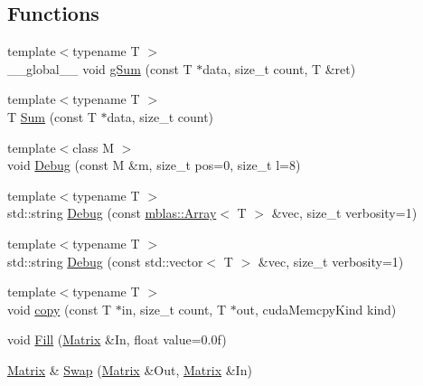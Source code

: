 \subsection*{Functions}
\begin{DoxyCompactItemize}
\item 
{\footnotesize template$<$typename T $>$ }\\\+\_\+\+\_\+global\+\_\+\+\_\+ void \hyperlink{namespaceamunmt_1_1GPU_1_1mblas_a6d3fc25d9092bb620ee6cf18bf08466a}{g\+Sum} (const T $\ast$data, size\+\_\+t count, T \&ret)
\item 
{\footnotesize template$<$typename T $>$ }\\T \hyperlink{namespaceamunmt_1_1GPU_1_1mblas_a9ef50bea247d2ef942fbb6d73e3ccaa7}{Sum} (const T $\ast$data, size\+\_\+t count)
\item 
{\footnotesize template$<$class M $>$ }\\void \hyperlink{namespaceamunmt_1_1GPU_1_1mblas_acd328e19f90abba621b306ccfa9ac0a5}{Debug} (const M \&m, size\+\_\+t pos=0, size\+\_\+t l=8)
\item 
{\footnotesize template$<$typename T $>$ }\\std\+::string \hyperlink{namespaceamunmt_1_1GPU_1_1mblas_aabb52352b84ff8df12e584cc48f0c150}{Debug} (const \hyperlink{classamunmt_1_1GPU_1_1mblas_1_1Array}{mblas\+::\+Array}$<$ T $>$ \&vec, size\+\_\+t verbosity=1)
\item 
{\footnotesize template$<$typename T $>$ }\\std\+::string \hyperlink{namespaceamunmt_1_1GPU_1_1mblas_a0da5f0038d776f323a166d9deecac270}{Debug} (const std\+::vector$<$ T $>$ \&vec, size\+\_\+t verbosity=1)
\item 
{\footnotesize template$<$typename T $>$ }\\void \hyperlink{namespaceamunmt_1_1GPU_1_1mblas_a6531a040aa422fcd149f89b92f6d2585}{copy} (const T $\ast$in, size\+\_\+t count, T $\ast$out, cuda\+Memcpy\+Kind kind)
\item 
void \hyperlink{namespaceamunmt_1_1GPU_1_1mblas_aae3149752683fc6c3d719c495c161cbc}{Fill} (\hyperlink{namespaceamunmt_1_1GPU_1_1mblas_ab67821a8254de53e45a623cf73c0aef6}{Matrix} \&In, float value=0.\+0f)
\item 
\hyperlink{namespaceamunmt_1_1GPU_1_1mblas_ab67821a8254de53e45a623cf73c0aef6}{Matrix} \& \hyperlink{namespaceamunmt_1_1GPU_1_1mblas_a88b723882ca7b614a20e6e9edb5c214b}{Swap} (\hyperlink{namespaceamunmt_1_1GPU_1_1mblas_ab67821a8254de53e45a623cf73c0aef6}{Matrix} \&Out, \hyperlink{namespaceamunmt_1_1GPU_1_1mblas_ab67821a8254de53e45a623cf73c0aef6}{Matrix} \&In)

\end{DoxyCompactItemize}
